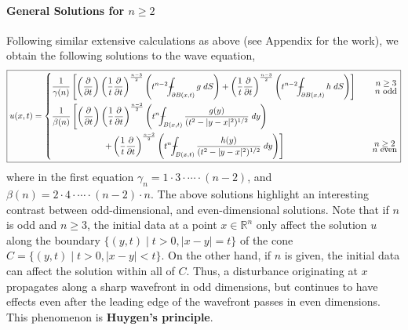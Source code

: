 \documentclass{article}
\def\Xint#1{\mathchoice
	{\XXint\displaystyle\textstyle{#1}}%
	{\XXint\textstyle\scriptstyle{#1}}%
	{\XXint\scriptstyle\scriptscriptstyle{#1}}%
	{\XXint\scriptscriptstyle\scriptscriptstyle{#1}}%
	\!\int}
\def\XXint#1#2#3{{\setbox0=\hbox{$#1{#2#3}{\int}$ }
		\vcenter{\hbox{$#2#3$ }}\kern-0.6\wd0}}
\def\dashint{\Xint-}
\numberwithin{equation}{section}
\begin{document}
	\paragraph{General Solutions for \texorpdfstring{$n\geq 2$}{n > 1}} Following similar extensive calculations as above (see Appendix for the work), we obtain the following solutions to the wave equation, 
	\begin{equation}
		\boxed{
			u(x, t) = 
			\left\{
			\begin{alignedat}{2}
				&\frac{1}{\gamma(n)}\left[\left(\frac{\partial}{\partial t}\right)\left(\frac{1}{t}\frac{\partial}{\partial t}\right)^{\frac{n-3}{2}}\left(t^{n-2}\dashint_{\partial B(x,t)}g\;dS\right) + \left(\frac{1}{t}\frac{\partial}{\partial t}\right)^{\frac{n-3}{2}}\left(t^{n-2}\dashint_{\partial B(x,t)}h\;dS\right)\right] &\qquad \substack{\displaystyle n \geq 3 \\ \displaystyle n \text{ odd}} \\
				&\frac{1}{\beta(n)}\left[\left(\frac{\partial}{\partial t}\right)\left(\frac{1}{t}\frac{\partial}{\partial t}\right)^{\frac{n-2}{2}}\left(t^{n}\dashint_{B(x,t)}\frac{g(y)}{(t^{2} - |y - x|^{2})^{1/2}}\;dy\right)\right. &\\
				&\qquad \qquad \qquad \left.+ \left(\frac{1}{t}\frac{\partial}{\partial t}\right)^{\frac{n-2}{2}}\left(t^{n}\dashint_{B(x,t)}\frac{h(y)}{(t^{2} - |y - x|^{2})^{1/2}}\;dy\right)\right] &\qquad \substack{\displaystyle n \geq 2 \\ \displaystyle n \text{ even}}
			\end{alignedat}
			\right.
		}
	\end{equation}
	where in the first equation $\gamma_{n} = 1 \cdot 3 \cdot \dotsm\cdot (n-2)$, and $\beta(n) = 2 \cdot 4 \cdot \dotsm \cdot (n-2) \cdot n$. The above solutions highlight an interesting contrast between odd-dimensional, and even-dimensional solutions. Note that if $n$ is odd and $n \geq 3$, the initial data at a point $x\in \mathbb{R}^{n}$ only affect the solution $u$ along the boundary $\{(y,t) \mid t > 0, |x -y| = t\}$ of the cone $C = \{(y,t)\mid t > 0, |x - y| < t\}$. On the other hand, if $n$ is given, the initial data can affect the solution within all of $C$. Thus, a disturbance originating at $x$ propagates along a sharp wavefront in odd dimensions, but continues to have effects even after the leading edge of the wavefront passes in even dimensions. This phenomenon is \textbf{Huygen's principle}. 
	
\end{document}
